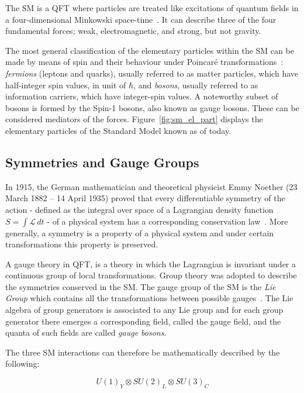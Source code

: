 		The \ac{SM} is a \ac{QFT} where particles are treated like excitations of quantum fields in a four-dimensional Minkowski space-time~\cite{Peskin1995}. It can describe three of the four fundamental forces; weak, electromagnetic, and strong, but not gravity.

		The most general classification of the elementary particles within the \ac{SM} can be made by means of spin and their behaviour under Poincaré transformations~\cite{Cottingham1998}: \textit{fermions} (leptons and quarks), usually referred to as matter particles, which have half-integer spin values, in unit of $\hbar$, and \textit{bosons}, usually referred to as information carriers, which have integer-spin values. A noteworthy subset of bosons is formed by the Spin-1 bosons, also known as gauge bosons. These can be considered mediators of the forces. Figure~\ref{fig:sm_el_part} displays the elementary particles of the Standard Model known as of today.



		\subsection*{Symmetries and Gauge Groups}

			In 1915, the German mathematician and theoretical physicist Emmy Noether (23 March 1882 – 14 April 1935) proved that every differentiable symmetry of the action - defined as the integral over space of a Lagrangian density function $S = \int \mathcal{L}\, dt$ - of a physical system has a corresponding conservation law~\cite{lederman2004symmetry}. More generally, a symmetry is a property of a physical system and under certain transformations this property is preserved. 

			A gauge theory in \ac{QFT}, is a theory in which the Lagrangian is invariant under a continuous group of local transformations. Group theory was adopted to describe the symmetries conserved in the \ac{SM}. The gauge group of the \ac{SM} is the \emph{Lie Group} which contains all the transformations between possible gauges~\cite{Cottingham1998}. The Lie algebra of group generators is associated to any Lie group and for each group generator there emerges a corresponding field, called the gauge field, and the quanta of such fields are called \emph{gauge bosons}.
			
			The three \ac{SM} interactions can therefore be mathematically described by the following:

			\begin{equation}
			\label{eq:SM_gaugeSym}
				U(1)_Y \otimes SU(2)_L \otimes SU(3)_C
			\end{equation}

